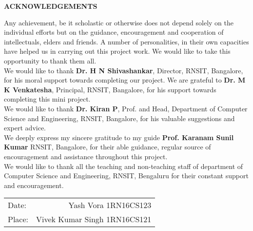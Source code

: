 \thispagestyle{empty}
\begin{center}
\textup{\large{\textbf{ACKNOWLEDGEMENTS}}} \\[0.1in]
\end{center}

\justify
\indent
Any achievement, be it scholastic or otherwise does not depend solely on the individual efforts but on the guidance, encouragement and cooperation of intellectuals, elders and friends. A number of personalities, in their own capacities have helped us in carrying out this project work. We would like to take this opportunity to thank them all. \\

We would like to thank \textbf{Dr. H N Shivashankar}, Director, RNSIT, Bangalore, for his moral support towards completing our project.
We are grateful to \textbf{Dr. M K Venkatesha}, Principal, RNSIT, Bangalore, for his support towards completing this mini project. \\

We would like to thank \textbf{Dr. Kiran P}, Prof. and Head, Department of Computer Science and Engineering, RNSIT, Bangalore, for his valuable suggestions and expert advice. \\

We deeply express my sincere gratitude to my guide \textbf{Prof. Karanam Sunil Kumar} RNSIT, Bangalore, for their able guidance, regular source of encouragement and assistance throughout this project. \\

We would like to thank all the teaching and non-teaching staff of department of Computer Science and Engineering, RNSIT, Bengaluru for their constant support and encouragement.\\[3.3in]
\justify
\begin{tabular}{l r}
\textup{Date:} & \hspace{9cm}\textup{Yash Vora 1RN16CS123}\\
\textup{Place:} & \hspace{9cm}\textup{Vivek Kumar Singh 1RN16CS121}
\end{tabular}


\pagebreak